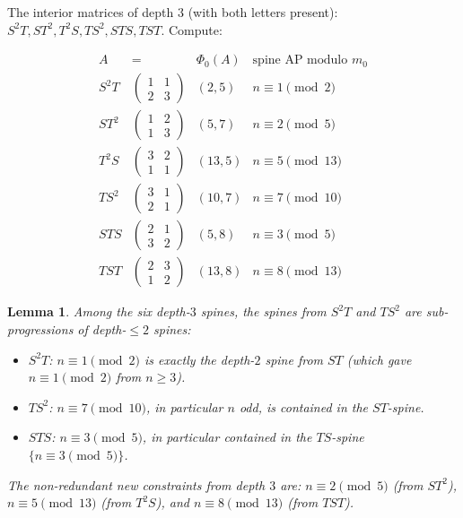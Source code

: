 \documentclass[11pt]{article}
\newtheorem{lemma}[theorem]{Lemma}
\theoremstyle{definition}
\newcommand{\Phzero}{\Phi_0}
\begin{document}
The interior matrices of depth $3$ (with both letters present): $S^2T, ST^2, T^2S, TS^2, STS, TST$. Compute:

\[
\begin{array}{lcll}
A & = & \Phzero(A) & \text{spine AP modulo $m_0$} \\
\hline
S^2T & \begin{pmatrix}1&1\\2&3\end{pmatrix} & (2, 5) & n \equiv 1 \pmod 2 \\
ST^2 & \begin{pmatrix}1&2\\1&3\end{pmatrix} & (5, 7) & n \equiv 2 \pmod 5 \\
T^2S & \begin{pmatrix}3&2\\1&1\end{pmatrix} & (13, 5) & n \equiv 5 \pmod{13} \\
TS^2 & \begin{pmatrix}3&1\\2&1\end{pmatrix} & (10, 7) & n \equiv 7 \pmod{10} \\
STS & \begin{pmatrix}2&1\\3&2\end{pmatrix} & (5, 8) & n \equiv 3 \pmod 5 \\
TST & \begin{pmatrix}2&3\\1&2\end{pmatrix} & (13, 8) & n \equiv 8 \pmod{13}
\end{array}
\]

\begin{lemma}\label{lem:depth3-redundancy}
Among the six depth-$3$ spines, the spines from $S^2T$ and $TS^2$ are sub-progressions of depth-$\le 2$ spines:
\begin{itemize}
\item $S^2T$: $n \equiv 1 \pmod 2$ is exactly the depth-$2$ spine from $ST$ (which gave $n \equiv 1 \pmod 2$ from $n \ge 3$).
\item $TS^2$: $n \equiv 7 \pmod{10}$, in particular $n$ odd, is contained in the $ST$-spine.
\item $STS$: $n \equiv 3 \pmod 5$, in particular contained in the $TS$-spine $\{n \equiv 3 \pmod 5\}$.
\end{itemize}
The non-redundant new constraints from depth $3$ are: $n \equiv 2 \pmod 5$ (from $ST^2$), $n \equiv 5 \pmod{13}$ (from $T^2S$), and $n \equiv 8 \pmod{13}$ (from $TST$).
\end{lemma}
\end{document}

